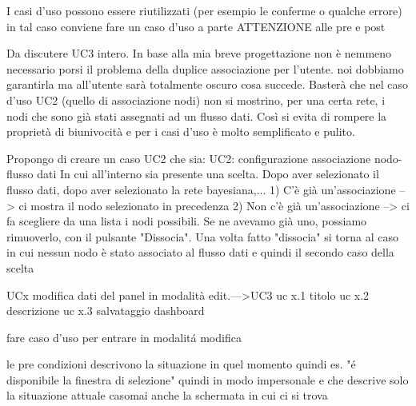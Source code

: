 
I casi d'uso possono essere riutilizzati (per esempio le conferme o qualche errore) in tal caso conviene fare un caso d'uso a parte
ATTENZIONE alle pre e post

Da discutere UC3 intero. In base alla mia breve progettazione non è nemmeno necessario porsi il problema della duplice associazione per l'utente. noi dobbiamo garantirla ma all'utente sarà totalmente oscuro cosa succede. 
Basterà che nel caso d'uso UC2 (quello di associazione nodi) non si mostrino, per una certa rete, i nodi che sono già stati assegnati ad un flusso dati. Così si evita di rompere la proprietà di biunivocità e per i casi d'uso è molto semplificato e pulito.

Propongo di creare un caso UC2 che sia:
UC2: configurazione associazione nodo-flusso dati
In cui all'interno sia presente una scelta.
Dopo aver selezionato il flusso dati, dopo aver selezionato la rete bayesiana,...
1) C'è già un'associazione --> ci mostra il nodo selezionato in precedenza
2) Non c'è già un'associazione --> ci fa scegliere da una lista i nodi possibili.
Se ne avevamo già uno, possiamo rimuoverlo, con il pulsante "Dissocia".
Una volta fatto "dissocia" si torna al caso in cui nessun nodo è stato associato al flusso dati e quindi il secondo caso della scelta


UCx modifica dati del panel in modalità edit.--->UC3
    uc x.1 titolo
    uc x.2 descrizione
    uc x.3 salvataggio dashboard

fare caso d'uso per entrare in modalitá modifica


le pre condizioni descrivono la situazione in quel momento quindi es. "é disponibile la finestra di selezione" quindi in modo impersonale e che descrive solo la situazione attuale
casomai anche la schermata in cui ci si trova